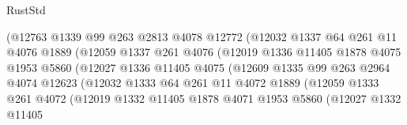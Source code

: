 \begin{lexlean}{RustStd}
\begin{coremodule}
                              (@12763
                                @1339
                                @99
                                @263
                                @2813
                                @4078
                                @12772
                                (@12032
                                  @1337
                                  @64
                                  @261
                                  @11
                                  @4076
                                  @1889
                                  (@12059
                                    @1337
                                    @261
                                    @4076
                                    (@12019
                                      @1336
                                      @11405
                                      @1878
                                      @4075
                                      @1953
                                      @5860
                                      (@12027
                                        @1336
                                        @11405
                                        @4075
                                        (@12609
                                          @1335
                                          @99
                                          @263
                                          @2964
                                          @4074
                                          @12623
                                          (@12032
                                            @1333
                                            @64
                                            @261
                                            @11
                                            @4072
                                            @1889
                                            (@12059
                                              @1333
                                              @261
                                              @4072
                                              (@12019
                                                @1332
                                                @11405
                                                @1878
                                                @4071
                                                @1953
                                                @5860
                                                (@12027
                                                  @1332
                                                  @11405

\end{coremodule}
\end{lexlean}
